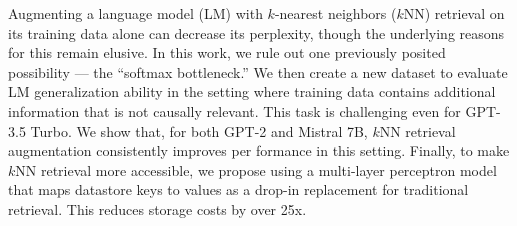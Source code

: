 Augmenting a language model (LM) with $k$-nearest neighbors ($k$NN) retrieval on its training data alone can decrease its perplexity, though the underlying reasons for this remain elusive. In this work, we rule out one previously posited possibility — the “softmax bottleneck.” We then create a new dataset to evaluate LM generalization ability in the setting where training data contains additional information that is not causally relevant. This task is challenging even for GPT-3.5 Turbo. We show that, for both GPT-2 and Mistral 7B, $k$NN retrieval augmentation consistently improves per formance in this setting. Finally, to make $k$NN retrieval more accessible, we propose using a multi-layer perceptron model that maps datastore keys to values as a drop-in replacement for traditional retrieval. This reduces storage costs by over 25x.